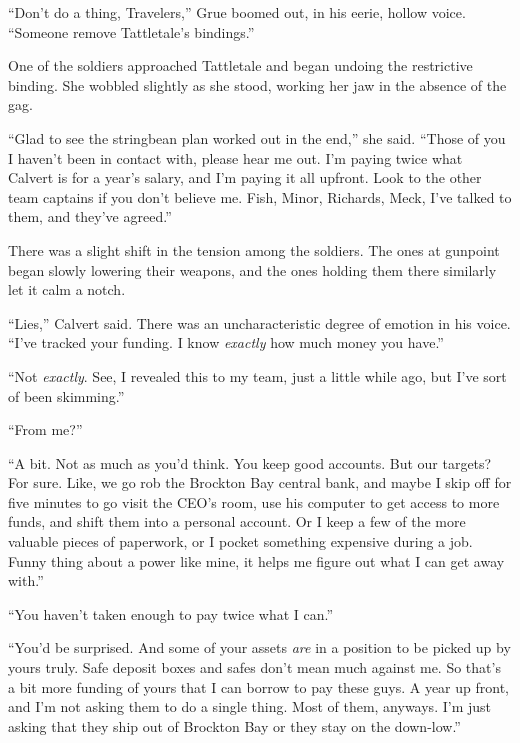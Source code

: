 ``Don't do a thing, Travelers,'' Grue boomed out, in his eerie, hollow voice.  ``Someone remove Tattletale's bindings.''



One of the soldiers approached Tattletale and began undoing the restrictive binding.  She wobbled slightly as she stood, working her jaw in the absence of the gag.



``Glad to see the stringbean plan worked out in the end,'' she said.  ``Those of you I haven't been in contact with, please hear me out.  I'm paying twice what Calvert is for a year's salary, and I'm paying it all upfront.  Look to the other team captains if you don't believe me.  Fish, Minor, Richards, Meck, I've talked to them, and they've agreed.''



There was a slight shift in the tension among the soldiers.  The ones at gunpoint began slowly lowering their weapons, and the ones holding them there similarly let it calm a notch.



``Lies,'' Calvert said.  There was an uncharacteristic degree of emotion in his voice.  ``I've tracked your funding.  I know \emph{exactly} how much money you have.''



``Not \emph{exactly}.  See, I revealed this to my team, just a little while ago, but I've sort of been skimming.''



``From me?''



``A bit.  Not as much as you'd think.  You keep good accounts.  But our targets?  For sure.  Like, we go rob the Brockton Bay central bank, and maybe I skip off for five minutes to go visit the CEO's room, use his computer to get access to more funds, and shift them into a personal account.  Or I keep a few of the more valuable pieces of paperwork, or I pocket something expensive during a job.  Funny thing about a power like mine, it helps me figure out what I can get away with.''



``You haven't taken enough to pay twice what I can.''



``You'd be surprised.  And some of your assets \emph{are} in a position to be picked up by yours truly.  Safe deposit boxes and safes don't mean much against me.  So that's a bit more funding of yours that I can borrow to pay these guys.  A year up front, and I'm not asking them to do a single thing.  Most of them, anyways.  I'm just asking that they ship out of Brockton Bay or they stay on the down-low.''




